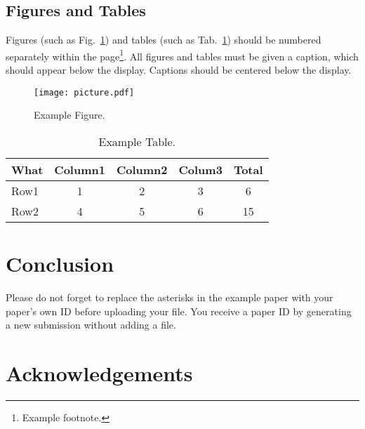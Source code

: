 \documentclass[11pt,twoside,twocolumn,a4paper]{article}
\begin{document}
\subsection{Figures and Tables}
Figures (such as Fig.~\ref{fig:total}) and tables (such as Tab.~\ref{tab:detail})
should be numbered separately within the page\footnote{Example footnote.}.  All
figures and tables must be given a caption, which should appear below
the display. Captions should be centered below the display.

\begin{figure}[htbp]
    \centering
    \texttt{[image: picture.pdf]}
    \caption{Example Figure.}
    \label{fig:total}
\end{figure}

\begin{table}
  \begin{center}
    \begin{tabular}{l | c c c | c}
        What      & Column1 & Column2 & Colum3 & Total\\ \hline\hline
      Row1        &  1  & 2     & 3 & 6 \\
      Row2 &   4  & 5     & 6 & 15 \\
    \end{tabular}
  \end{center}
  \caption{Example Table.}
  \label{tab:detail}
\end{table}


\section{Conclusion}

Please do not forget to replace the asterisks in the example paper with your paper's own ID before uploading your file.
You receive a paper ID by generating a new submission without adding a file.

\section*{Acknowledgements}


{\small


}
\end{document}

